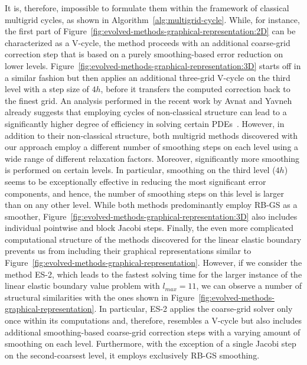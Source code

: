 It is, therefore, impossible to formulate them within the framework of classical multigrid cycles, as shown in Algorithm~\ref{alg:multigrid-cycle}.
While, for instance, the first part of Figure~\ref{fig:evolved-methods-graphical-representation:2D} can be characterized as a V-cycle, the method proceeds with an additional coarse-grid correction step that is based on a purely smoothing-based error reduction on lower levels.
Figure~\ref{fig:evolved-methods-graphical-representation:3D} starts off in a similar fashion but then applies an additional three-grid V-cycle on the third level with a step size of $4h$, before it transfers the computed correction back to the finest grid.
An analysis performed in the recent work by Avnat and Yavneh already suggests that employing cycles of non-classical structure can lead to a significantly higher degree of efficiency in solving certain PDEs~\cite{avnat2022recursive}. 
However, in addition to their non-classical structure, both multigrid methods discovered with our approach employ a different number of smoothing steps on each level using a wide range of different relaxation factors. 
Moreover, significantly more smoothing is performed on certain levels.
In particular, smoothing on the third level ($4h$) seems to be exceptionally effective in reducing the most significant error components, and hence, the number of smoothing steps on this level is larger than on any other level.
While both methods predominantly employ RB-GS as a smoother, Figure~\ref{fig:evolved-methods-graphical-representation:3D} also includes individual pointwise and block Jacobi steps.
Finally, the even more complicated computational structure of the methods discovered for the linear elastic boundary prevents us from including their graphical representations similar to Figure~\ref{fig:evolved-methods-graphical-representation}.
However, if we consider the method ES-2, which leads to the fastest solving time for the larger instance of the linear elastic boundary value problem with $l_{max} = 11$, we can observe a number of structural similarities with the ones shown in Figure~\ref{fig:evolved-methods-graphical-representation}.
In particular, ES-2 applies the coarse-grid solver only once within its computations and, therefore, resembles a V-cycle but also includes additional smoothing-based coarse-grid correction steps with a varying amount of smoothing on each level.
Furthermore, with the exception of a single Jacobi step on the second-coarsest level, it employs exclusively RB-GS smoothing.

